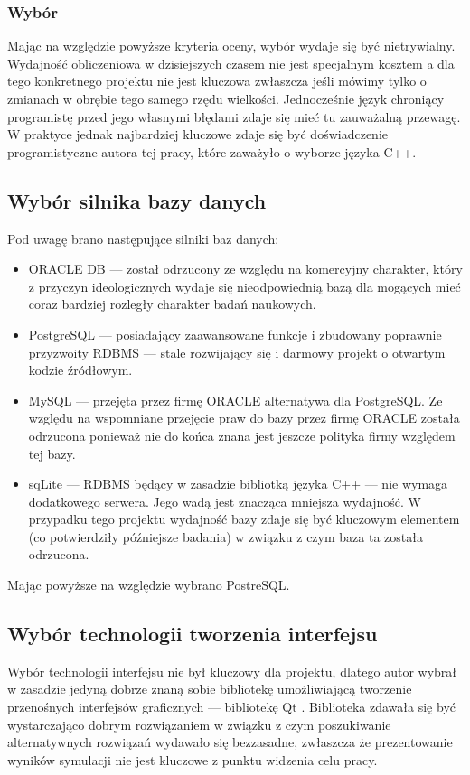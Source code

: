 {\subsubsection{Wybór}
\par{
Mając na względzie powyższe kryteria oceny, wybór wydaje się być nietrywialny. Wydajność obliczeniowa w dzisiejszych czasem nie jest specjalnym kosztem a dla tego konkretnego projektu nie jest kluczowa zwłaszcza jeśli mówimy tylko o zmianach w obrębie tego samego rzędu wielkości. Jednocześnie język chroniący programistę przed jego własnymi błędami zdaje się mieć tu zauważalną przewagę. W praktyce jednak najbardziej kluczowe zdaje się być doświadczenie programistyczne autora tej pracy, które zaważyło o wyborze języka C++.
}

\subsection{Wybór silnika bazy danych}
\par{
Pod uwagę brano następujące silniki baz danych:
\begin{itemize}
\item ORACLE DB --- został odrzucony ze względu na komercyjny charakter, który z przyczyn ideologicznych wydaje się nieodpowiednią bazą dla mogących mieć coraz bardziej rozległy charakter badań naukowych.
\item PostgreSQL --- posiadający zaawansowane funkcje i zbudowany poprawnie przyzwoity RDBMS --- stale rozwijający się i darmowy projekt o otwartym kodzie źródłowym.
\item MySQL --- przejęta przez firmę ORACLE alternatywa dla PostgreSQL. Ze względu na wspomniane przejęcie praw do bazy przez firmę ORACLE została odrzucona ponieważ nie do końca znana jest jeszcze polityka firmy względem tej bazy.
\item sqLite --- RDBMS będący w zasadzie bibliotką języka C++ --- nie wymaga dodatkowego serwera. Jego wadą jest znacząca mniejsza wydajność. W przypadku tego projektu wydajność bazy zdaje się być kluczowym elementem (co potwierdziły późniejsze badania) w związku z czym baza ta została odrzucona.
\end{itemize}
Mając powyższe na względzie wybrano PostreSQL.
}

\subsection{Wybór technologii tworzenia interfejsu}
\par{
Wybór technologii interfejsu nie był kluczowy dla projektu, dlatego autor wybrał w zasadzie jedyną dobrze znaną sobie bibliotekę umożliwiającą tworzenie przenośnych interfejsów graficznych --- bibliotekę Qt \cite{Qt}. Biblioteka zdawała się być wystarczająco dobrym rozwiązaniem w związku z czym poszukiwanie alternatywnych rozwiązań wydawało się bezzasadne, zwłaszcza że prezentowanie wyników symulacji nie jest kluczowe z punktu widzenia celu pracy.
}

}
